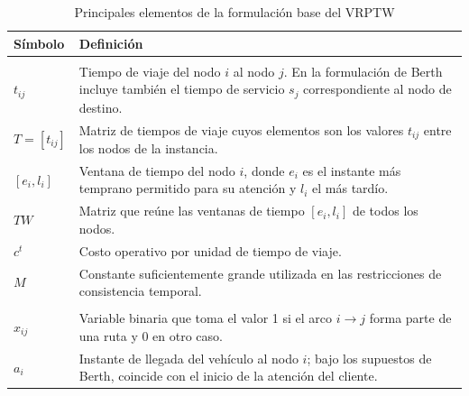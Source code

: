 \documentclass[11pt]{article}
\begin{document}
\begin{table}[ht]
\centering
\small
\caption{Principales elementos de la formulación base del VRPTW}
\label{tab:vrptw_base}

\renewcommand{\arraystretch}{1.12}

\begin{tabularx}{\textwidth}{@{}>{\raggedright\arraybackslash}p{}X@{}}
\toprule
\textbf{Símbolo} & \textbf{Definición} \\
\midrule

\multicolumn{2}{@{}l}{\textbf{\textit{Parámetros}}} \\[0.35em]

\(t_{ij}\) &
Tiempo de viaje del nodo \(i\) al nodo \(j\). En la formulación de Berth incluye
también el tiempo de servicio \(s_j\) correspondiente al nodo de destino. \\[0.15em]

\(T=[t_{ij}]\) &
Matriz de tiempos de viaje cuyos elementos son los valores \(t_{ij}\) entre los nodos
de la instancia. \\[0.15em]

\([e_i,l_i]\) &
Ventana de tiempo del nodo \(i\), donde \(e_i\) es el instante más temprano permitido
para su atención y \(l_i\) el más tardío. \\[0.15em]

\(TW\) &
Matriz que reúne las ventanas de tiempo \([e_i,l_i]\) de todos los nodos. \\[0.15em]

\(c^t\) &
Costo operativo por unidad de tiempo de viaje. \\[0.15em]

\(M\) &
Constante suficientemente grande utilizada en las restricciones de consistencia temporal. \\

\addlinespace[0.65em]
\multicolumn{2}{@{}l}{\textbf{\textit{Variables de decisión}}} \\[0.35em]

\(x_{ij}\) &
Variable binaria que toma el valor 1 si el arco \(i\rightarrow j\) forma parte de una
ruta y 0 en otro caso. \\[0.15em]

\(a_i\) &
Instante de llegada del vehículo al nodo \(i\); bajo los supuestos de Berth,
coincide con el inicio de la atención del cliente. \\

\bottomrule
\end{tabularx}
\end{table}
\end{document}
